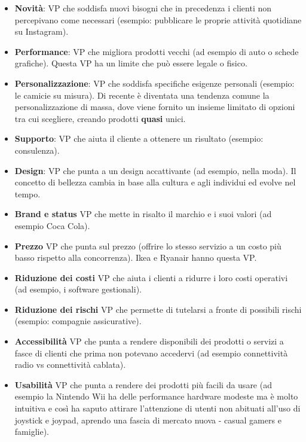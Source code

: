 \begin{itemize}

\item \textbf{Novità}: VP che soddisfa nuovi bisogni che in precedenza i
clienti non percepivano come necessari (esempio: pubblicare le proprie attività
quotidiane su Instagram).

\item \textbf{Performance}: VP che migliora prodotti vecchi (ad esempio di auto
o schede grafiche). Questa VP ha un limite che può essere legale o fisico.

\item \textbf{Personalizzazione}: VP che soddisfa specifiche esigenze personali
(esempio: le camicie su misura). Di recente è diventata una tendenza comune la
personalizzazione di massa, dove viene fornito un insieme limitato di opzioni
tra cui scegliere, creando prodotti \textbf{quasi} unici.

\item \textbf{Supporto}: VP che aiuta il cliente a ottenere un risultato
(esempio: consulenza).

\item \textbf{Design}: VP che punta a un design accattivante (ad esempio, nella
moda). Il concetto di bellezza cambia in base alla cultura e agli individui ed
evolve nel tempo.

\item \textbf{Brand e status} VP che mette in risalto il marchio e i suoi valori
(ad esempio Coca Cola).

\item \textbf{Prezzo} VP che punta sul prezzo (offrire lo stesso servizio a un
costo più basso rispetto alla concorrenza). Ikea e Ryanair hanno questa VP.

\item \textbf{Riduzione dei costi} VP che aiuta i clienti a ridurre i loro
costi operativi (ad esempio, i software gestionali).

\item \textbf{Riduzione dei rischi} VP che permette di tutelarsi a fronte di
possibili rischi (esempio: compagnie assicurative).

\item \textbf{Accessibilità} VP che punta a rendere disponibili dei prodotti
o servizi a fasce di clienti che prima non potevano accedervi (ad esempio
connettività radio vs connettività cablata).

\item \textbf{Usabilità} VP che punta a rendere dei prodotti più facili da
usare (ad esempio la Nintendo Wii ha delle performance hardware modeste ma è
molto intuitiva e così ha saputo attirare l'attenzione di utenti non abituati
all'uso di joystick e joypad, aprendo una fascia di mercato nuova - casual
gamers e famiglie).

\end{itemize}

